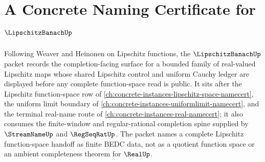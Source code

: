 \chapter{A Concrete Naming Certificate for $\LipschitzBanachUp$}
\label{ch:concrete-instances-lipschitz-banach-namecert}

Following Weaver and Heinonen on Lipschitz functions, the $\LipschitzBanachUp$ packet records the completion-facing surface for a bounded family of real-valued Lipschitz maps whose shared Lipschitz control and uniform Cauchy ledger are displayed before any complete function-space read is public. It sits after the Lipschitz function-space row of \autoref{ch:concrete-instances-lipschitz-space-namecert}, the uniform limit boundary of \autoref{ch:concrete-instances-uniformlimit-namecert}, and the terminal real-name route of \autoref{ch:concrete-instances-real-namecert}; it also consumes the finite-window and regular-rational completion spine supplied by $\StreamNameUp$ and $\RegSeqRatUp$. The packet names a complete Lipschitz function-space handoff as finite BEDC data, not as a quotient function space or an ambient completeness theorem for $\RealUp$.

